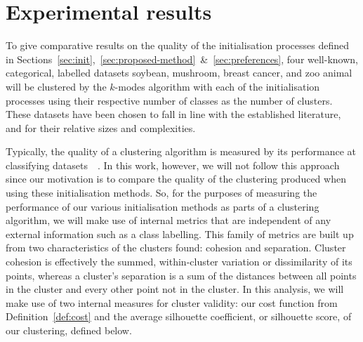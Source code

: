 \section{Experimental results}\label{sec:results}

To give comparative results on the quality of the initialisation processes 
defined in
Sections~\ref{sec:init},~\ref{sec:proposed-method}~\&~\ref{sec:preferences},
four well-known, categorical, labelled datasets \- soybean, mushroom, breast
cancer, and zoo animal \- will be clustered by the \(k\)-modes algorithm with
each of the initialisation processes using their respective number of classes as
the number of clusters. These datasets have been chosen to fall in line with the
established literature, and for their relative sizes and complexities.

Typically, the quality of a clustering algorithm is measured by its performance
at classifying datasets~\cite{Huang1998}\cite{Cao2009}~\cite{Olaode2014}. In
this work, however, we will not follow this approach since our motivation is to
compare the quality of the clustering produced when using these initialisation
methods. So, for the purposes of measuring the performance of our various
initialisation methods as parts of a clustering algorithm, we will make use of
internal metrics that are independent of any external information such as a
class labelling. This family of metrics are built up from two characteristics of
the clusters found: cohesion and separation. Cluster cohesion is effectively the
summed, within-cluster variation or dissimilarity of its points, whereas a
cluster's separation is a sum of the distances between all points in the cluster
and every other point not in the cluster. In this analysis, we will make use of
two internal measures for cluster validity: our cost function from
Definition~\ref{def:cost} and the average silhouette coefficient, or silhouette
score, of our clustering, defined below. 

